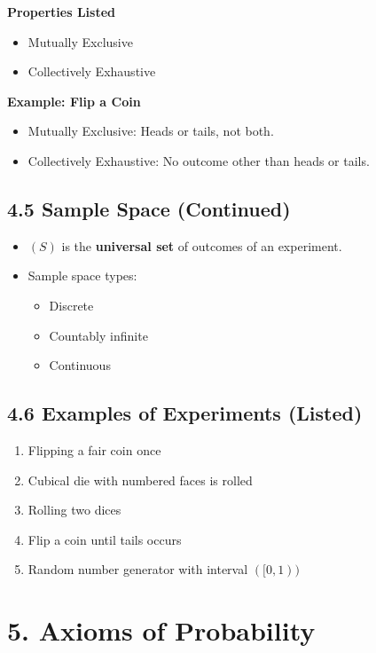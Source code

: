 \documentclass[12pt]{article}
\begin{document}
\textbf{Properties Listed}
\begin{itemize}
  \item Mutually Exclusive
  \item Collectively Exhaustive
\end{itemize}

\textbf{Example: Flip a Coin}
\begin{itemize}
  \item Mutually Exclusive: Heads or tails, not both.
  \item Collectively Exhaustive: No outcome other than heads or tails.
\end{itemize}

\subsection*{4.5 Sample Space (Continued)}

\begin{itemize}
  \item $( S )$ is the \textbf{universal set} of outcomes of an experiment.
  \item Sample space types:
  \begin{itemize}
    \item Discrete
    \item Countably infinite
    \item Continuous
  \end{itemize}
\end{itemize}

\subsection*{4.6 Examples of Experiments (Listed)}

\begin{enumerate}
  \item Flipping a fair coin once
  \item Cubical die with numbered faces is rolled
  \item Rolling two dices
  \item Flip a coin until tails occurs
  \item Random number generator with interval $([0,1))$
\end{enumerate}

\section*{5. Axioms of Probability}
\end{document}
